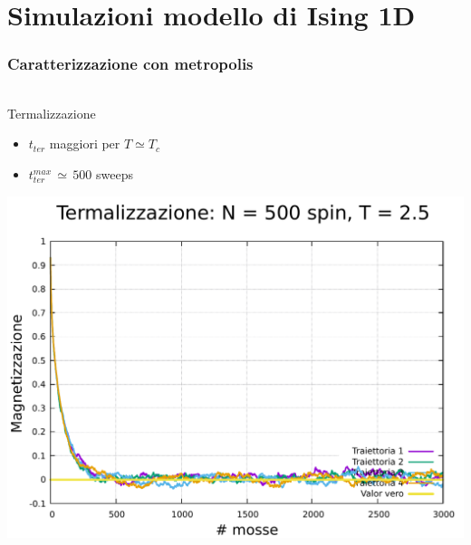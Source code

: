 \section{Simulazioni modello di Ising 1D}

\begin{frame}
    \frametitle{Caratterizzazione con metropolis}
    \framesubtitle{}

    \begin{columns}
        \begin{column}{0.33\textwidth}
            \begin{block}{Termalizzazione}

                \begin{itemize}[itemsep=0.5em, label=$\diamond$]
                    \item $t_{ter}$ maggiori per $T \simeq T_c$
                    \item $t_{ter}^{max}\,\simeq\,500$ sweeps
                \end{itemize}

                \vspace{0.5cm}

                \centering
                \includegraphics[width=\textwidth]{Immagini/simIsing2D/term_500_2.5.pdf}
            
            \end{block}
        \end{column}
    

\end{columns}
\end{frame}
